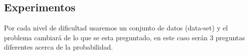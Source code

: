 \documentclass[
  spanish,
]{article}
\begin{document}
\hypertarget{experimentos}{%
\subsection{Experimentos}\label{experimentos}}

Por cada nivel de dificultad usaremos un conjunto de datos (data-set) y
el problema cambiará de lo que se esta preguntado, en este caso serán 3
preguntas diferentes acerca de la probabilidad.
\end{document}
